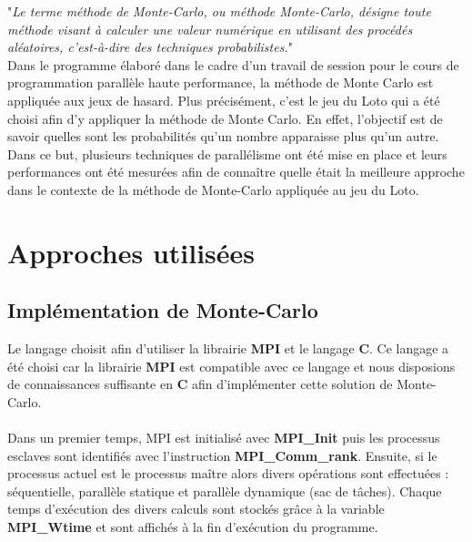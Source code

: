 \documentclass[a4paper,12pt]{article}
\begin{document}
"\textit{Le terme méthode de Monte-Carlo, ou méthode Monte-Carlo, désigne toute méthode visant à calculer une valeur numérique en utilisant des procédés aléatoires, c'est-à-dire des techniques probabilistes.}" \cite{wiki:montecarlo}
\\
Dans le programme élaboré dans le cadre d'un travail de session pour le cours de programmation parallèle haute performance, la méthode de Monte Carlo est appliquée aux jeux de hasard.
Plus précisément, c'est le jeu du Loto qui a été choisi afin d'y appliquer la méthode de Monte Carlo. En effet, l'objectif est de savoir quelles sont les probabilités qu'un nombre apparaisse plus qu'un autre. Dans ce but, plusieurs techniques de parallélisme ont été mise en place et leurs performances ont été mesurées afin de connaître quelle était la meilleure approche dans le contexte de la méthode de Monte-Carlo appliquée au jeu du Loto. 


\section{Approches utilisées}

\subsection{Implémentation de Monte-Carlo}
Le langage choisit afin d'utiliser la librairie \textbf{MPI} et le langage \textbf{C}. Ce langage a été choisi car la librairie \textbf{MPI} est compatible avec ce langage et nous disposions de connaissances suffisante en \textbf{C} afin d'implémenter cette solution de Monte-Carlo. 
\\\\Dans un premier temps, MPI est initialisé avec \textbf{MPI\_Init} puis les processus esclaves sont identifiés avec l'instruction \textbf{MPI\_Comm\_rank}. Ensuite, si le processus actuel est le processus maître alors divers opérations sont effectuées : séquentielle, parallèle statique et parallèle dynamique (sac de tâches). Chaque temps d'exécution des divers calculs sont stockés grâce à la variable \textbf{MPI\_Wtime} et sont affichés à la fin d'exécution du programme.
\end{document}
